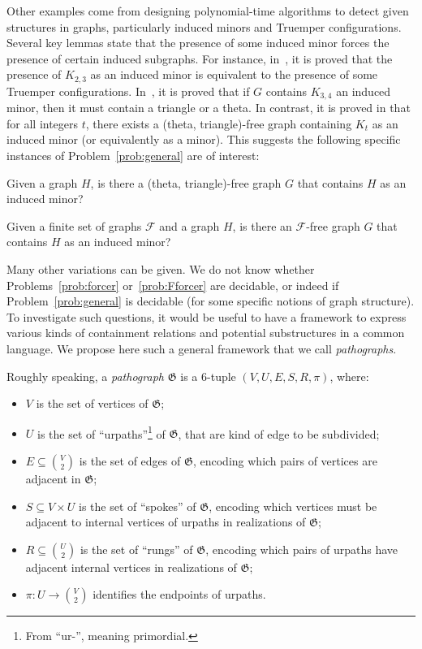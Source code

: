 \documentclass{article}
\newcommand{\Fc}{\mathcal{F}}
\newcommand{\Gf}{\mathfrak{G}}
\begin{document}
Other examples come from designing polynomial-time algorithms to detect given structures in graphs, particularly induced minors and Truemper configurations. Several key lemmas state that the presence of some induced minor forces the presence of certain induced subgraphs. For instance, in~\cite{DBLP:conf/iwoca/DallardDHMPT24}, it is proved that the presence of $K_{2, 3}$ as an induced minor is equivalent to the presence of some Truemper configurations. In~\cite{chktw}, it is proved that if $G$ contains $K_{3, 4}$ an induced minor, then it must contain a triangle or a theta. In contrast, it is proved in \cite{DBLP:journals/jgt/SintiariT21} that for all integers $t$, there exists a (theta, triangle)-free graph containing $K_t$ as an induced minor (or equivalently as a minor). This suggests the following specific instances of Problem~\ref{prob:general} are of interest:

\begin{problem}\label{prob:forcer}
Given a graph $H$, is there a (theta, triangle)-free graph $G$ that contains $H$ as an induced minor?
\end{problem}

\begin{problem}\label{prob:Fforcer}
Given a finite set of graphs $\Fc$ and a graph $H$, is there an $\Fc$-free graph $G$ that contains $H$ as an induced minor?
\end{problem}

Many other variations can be given. We do not know whether Problems~\ref{prob:forcer} or~\ref{prob:Fforcer} are decidable, or indeed if Problem~\ref{prob:general} is decidable (for some specific notions of graph structure). To investigate such questions, it would be useful to have a framework to express various kinds of containment relations and potential substructures in a common language. We propose here such a general framework that we call \textit{pathographs}.

Roughly speaking, a \textit{pathograph} $\Gf$ is a 6-tuple $(V, U, E, S, R, \pi)$, where:
\begin{itemize}
    \item $V$ is the set of vertices of $\Gf$;
    \item $U$ is the set of ``urpaths''\footnote{From ``ur-'', meaning primordial.} of $\Gf$, that are kind of edge to be subdivided;
    \item $E\subseteq \binom{V}{2}$ is the set of edges of $\Gf$, encoding which pairs of vertices are adjacent in $\Gf$;
    \item $S\subseteq V\times U$ is the set of ``spokes'' of $\Gf$, encoding which vertices must be adjacent to internal vertices of urpaths in realizations of $\Gf$;
    \item $R\subseteq \binom{U}{2}$ is the set of ``rungs'' of $\Gf$, encoding which pairs of urpaths have adjacent internal vertices in realizations of $\Gf$;
    \item $\pi:U\to \binom{V}{2}$ identifies the endpoints of urpaths.
\end{itemize}
\end{document}
